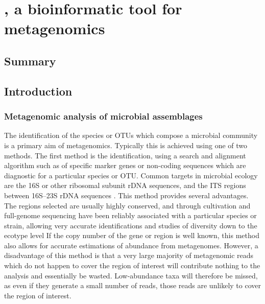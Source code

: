 \chapter{, a bioinformatic tool for metagenomics}
\label{ch:minspec}


\section{Summary}

\section{Introduction}

\subsection{Metagenomic analysis of microbial assemblages}

The identification of the species or \acp{OTU} which compose a microbial community is a primary aim of metagenomics.
Typically this is achieved using one of two methods.
The first method is the identification, using a search and alignment algorithm such as  of specific marker genes or non-coding sequences which are diagnostic for a particular species or \ac{OTU}.
Common targets in microbial ecology are the 16S or other ribosomal subunit rDNA sequences, and the \ac{ITS} regions between 16S--23S rDNA sequences \citep[e.g.][]{Brown:2012gna}.
This method provides several advantages.
The regions selected are usually highly conserved, and through cultivation and full-genome sequencing have been reliably associated with a particular species or strain, allowing very accurate identifications and studies of diversity down to the ecotype level \citep[e.g.][]{Brown:2012gna}
If the copy number of the gene or region is well known, this method also allows for accurate estimations of abundance from metagenomes.
However, a disadvantage of this method is that a very large majority of metagenomic reads which do not happen to cover the region of interest will contribute nothing to the analysis and essentially be wasted.
Low-abundance taxa will therefore be missed, as even if they generate a small number of reads, those reads are unlikely to cover the region of interest.

